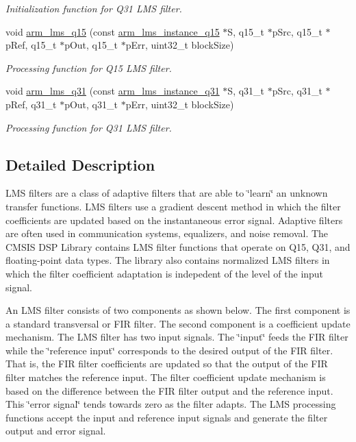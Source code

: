 \begin{DoxyCompactItemize}
\begin{DoxyCompactList}\small\item\em Initialization function for Q31 L\-M\-S filter. \end{DoxyCompactList}\item 
void \hyperlink{group___l_m_s_gacde16c17eb75979f81b34e2e2a58c7ac}{arm\-\_\-lms\-\_\-q15} (const \hyperlink{structarm__lms__instance__q15}{arm\-\_\-lms\-\_\-instance\-\_\-q15} $\ast$S, q15\-\_\-t $\ast$p\-Src, q15\-\_\-t $\ast$p\-Ref, q15\-\_\-t $\ast$p\-Out, q15\-\_\-t $\ast$p\-Err, uint32\-\_\-t block\-Size)
\begin{DoxyCompactList}\small\item\em Processing function for Q15 L\-M\-S filter. \end{DoxyCompactList}\item 
void \hyperlink{group___l_m_s_ga6a0abfe6041253a6f91c63b383a64257}{arm\-\_\-lms\-\_\-q31} (const \hyperlink{structarm__lms__instance__q31}{arm\-\_\-lms\-\_\-instance\-\_\-q31} $\ast$S, q31\-\_\-t $\ast$p\-Src, q31\-\_\-t $\ast$p\-Ref, q31\-\_\-t $\ast$p\-Out, q31\-\_\-t $\ast$p\-Err, uint32\-\_\-t block\-Size)
\begin{DoxyCompactList}\small\item\em Processing function for Q31 L\-M\-S filter. \end{DoxyCompactList}\end{DoxyCompactItemize}


\subsection{Detailed Description}
L\-M\-S filters are a class of adaptive filters that are able to \char`\"{}learn\char`\"{} an unknown transfer functions. L\-M\-S filters use a gradient descent method in which the filter coefficients are updated based on the instantaneous error signal. Adaptive filters are often used in communication systems, equalizers, and noise removal. The C\-M\-S\-I\-S D\-S\-P Library contains L\-M\-S filter functions that operate on Q15, Q31, and floating-\/point data types. The library also contains normalized L\-M\-S filters in which the filter coefficient adaptation is indepedent of the level of the input signal.

An L\-M\-S filter consists of two components as shown below. The first component is a standard transversal or F\-I\-R filter. The second component is a coefficient update mechanism. The L\-M\-S filter has two input signals. The \char`\"{}input\char`\"{} feeds the F\-I\-R filter while the \char`\"{}reference input\char`\"{} corresponds to the desired output of the F\-I\-R filter. That is, the F\-I\-R filter coefficients are updated so that the output of the F\-I\-R filter matches the reference input. The filter coefficient update mechanism is based on the difference between the F\-I\-R filter output and the reference input. This \char`\"{}error signal\char`\"{} tends towards zero as the filter adapts. The L\-M\-S processing functions accept the input and reference input signals and generate the filter output and error signal. 

